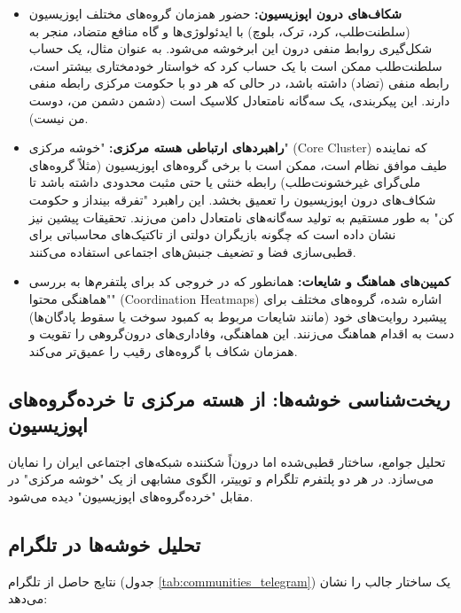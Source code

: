 \documentclass{article}
\begin{document}
	\begin{itemize}
		\item \textbf{شکاف‌های درون اپوزیسیون:} حضور همزمان گروه‌های مختلف اپوزیسیون (سلطنت‌طلب، کرد، ترک، بلوچ) با ایدئولوژی‌ها و گاه منافع متضاد، منجر به شکل‌گیری روابط منفی درون این ابرخوشه می‌شود. به عنوان مثال، یک حساب سلطنت‌طلب ممکن است با یک حساب کرد که خواستار خودمختاری بیشتر است، رابطه منفی (تضاد) داشته باشد، در حالی که هر دو با حکومت مرکزی رابطه منفی دارند. این پیکربندی، یک سه‌گانه نامتعادل کلاسیک است (دشمن دشمن من، دوست من نیست).
		\item \textbf{راهبردهای ارتباطی هسته مرکزی:} "خوشه مرکزی" (Core Cluster) که نماینده طیف موافق نظام است، ممکن است با برخی گروه‌های اپوزیسیون (مثلاً گروه‌های ملی‌گرای غیرخشونت‌طلب) رابطه خنثی یا حتی مثبت محدودی داشته باشد تا شکاف‌های درون اپوزیسیون را تعمیق بخشد. این راهبرد "تفرقه بینداز و حکومت کن" به طور مستقیم به تولید سه‌گانه‌های نامتعادل دامن می‌زند. تحقیقات پیشین نیز نشان داده است که چگونه بازیگران دولتی از تاکتیک‌های محاسباتی برای قطبی‌سازی فضا و تضعیف جنبش‌های اجتماعی استفاده می‌کنند.
		\item \textbf{کمپین‌های هماهنگ و شایعات:} همانطور که در خروجی کد برای پلتفرم‌ها به بررسی "هماهنگی محتوا" (Coordination Heatmaps) اشاره شده، گروه‌های مختلف برای پیشبرد روایت‌های خود (مانند شایعات مربوط به کمبود سوخت یا سقوط پادگان‌ها) دست به اقدام هماهنگ می‌زنند. این هماهنگی، وفاداری‌های درون‌گروهی را تقویت و همزمان شکاف با گروه‌های رقیب را عمیق‌تر می‌کند.
	\end{itemize}
	
	\subsection{ریخت‌شناسی خوشه‌ها: از هسته مرکزی تا خرده‌گروه‌های اپوزیسیون}
	تحلیل جوامع، ساختار قطبی‌شده اما درون‌اً شکننده شبکه‌های اجتماعی ایران را نمایان می‌سازد. در هر دو پلتفرم تلگرام و توییتر، الگوی مشابهی از یک "خوشه مرکزی" در مقابل "خرده‌گروه‌های اپوزیسیون" دیده می‌شود.
	
	\subsection{تحلیل خوشه‌ها در تلگرام}
	نتایج حاصل از تلگرام (جدول \ref{tab:communities_telegram}) یک ساختار جالب را نشان می‌دهد:
	
\end{document}
